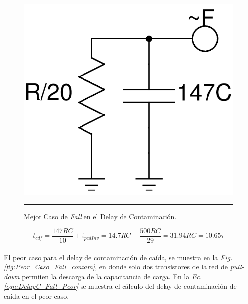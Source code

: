\documentclass[12pt,a4paper]{article} %
\begin{document}
\begin{figure}[htbp]
  \centering
    \includegraphics[scale=0.25]{./Mejor_Caso_Fall_contam.png}
    \rule{35em}{0.3pt}
  \caption[C_Carga]{Mejor Caso de \textit{Fall} en el Delay de Contaminación.}
  \label{fig:Mejor_Caso_Fall_contam}
\end{figure}

\begin{equation}\label{eqn:DelayC_Fall_Mejor}
t_{cdf} = \frac{147RC}{10}+t_{pcdInv}=14.7RC+\frac{500RC}{29}=31.94RC=10.65\tau
\end{equation}\\


El peor caso para el delay de contaminación de caída, se muestra en la \textit{Fig.\ref{fig:Peor_Caso_Fall_contam}}, en donde solo dos transistores de la red de \textit{pull-down} permiten la descarga de la capacitancia de carga. En la \textit{Ec.\ref{eqn:DelayC_Fall_Peor}} se muestra el cálculo del delay de contaminación de caída en el peor caso.\\
\end{document}
